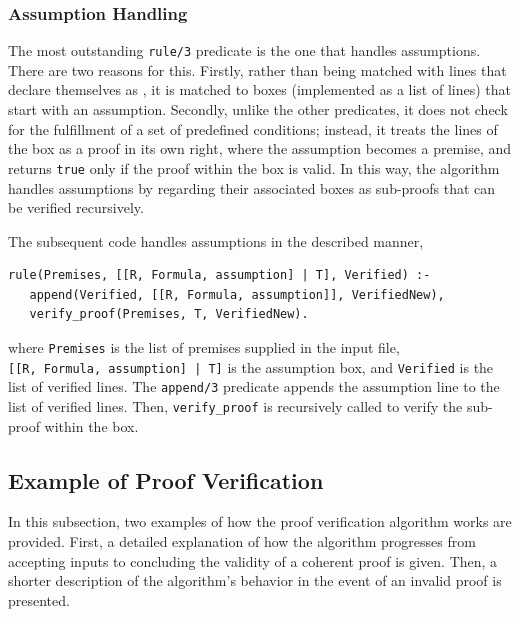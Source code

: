 \documentclass[a4paper, 11pt]{article}
\begin{document}
   \subsubsection{Assumption Handling}
   \label{assumption-handling}
   The most outstanding \texttt{rule/3} predicate is the one
   that handles assumptions. There are two reasons for this.
   Firstly, rather than being matched with lines that declare
   themselves as , it is matched to
   boxes (implemented as a list of lines) that start with an 
   assumption. Secondly, unlike the other predicates, it does
   not check for the fulfillment of a set of predefined
   conditions; instead, it treats the lines of the box as a
   proof in its own right, where the assumption becomes a
   premise, and returns \texttt{true} only if the proof within
   the box is valid. In this way, the algorithm handles
   assumptions by regarding their associated boxes as 
   sub-proofs that can be verified recursively.
   \bigbreak

   The subsequent code handles assumptions in the described
   manner,

\begin{verbatim}
rule(Premises, [[R, Formula, assumption] | T], Verified) :-
   append(Verified, [[R, Formula, assumption]], VerifiedNew),
   verify_proof(Premises, T, VerifiedNew).
\end{verbatim}
   
   where \texttt{Premises} is the list of premises supplied 
   in the input file, \\ 
   \texttt{[[R, Formula, assumption] | T]} is the assumption
   box, and \texttt{Verified} is the list of verified lines.
   The \texttt{append/3} predicate appends the assumption line
   to the list of verified lines. Then, \texttt{verify\_proof}
   is recursively called to verify the sub-proof within the
   box.

   \subsection{Example of Proof Verification}

   In this subsection, two examples of how the proof
   verification algorithm works are provided. First, a
   detailed explanation of how the algorithm progresses from
   accepting inputs to concluding the validity of a coherent 
   proof is given. Then, a shorter description of the 
   algorithm's behavior in the event of an invalid proof is 
   presented.
   
\end{document}

